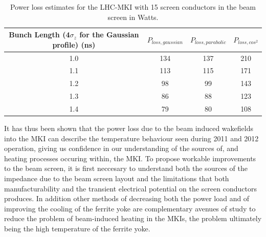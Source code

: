\begin{table}
\caption{Power loss estimates for the LHC-MKI with 15 screen conductors in the beam screen in Watts.}
\label{tab:mki-15-heating}
\begin{center}
\begin{tabular}{c | c | c | c}
Bunch Length (4$\sigma_{z}$ for the Gaussian profile) (ns) & $P_{loss, gaussian}$ & $P_{loss, parabolic}$ & $P_{loss, cos^{2}}$ \\ \hline
1.0 & 134 & 137 & 210 \\ \hline
1.1 & 113 & 115 & 171 \\ \hline
1.2 & 98 & 99 & 143 \\ \hline
1.3 & 86 & 88 & 123 \\ \hline
1.4 & 79 & 80 & 108 \\ \hline
\end{tabular}
\end{center}
\end{table}

It has thus been shown that the power loss due to the beam induced wakefields into the MKI can describe the temperature behaviour seen during 2011 and 2012 operation, giving us confidence in our understanding of the sources of, and heating processes occuring within, the MKI. To propose workable improvements to the beam screen, it is first neccesary to understand both the sources of the impedance due to the beam screen layout and the limitations that both manufacturability and the transient electrical potential on the screen conductors produces. In addition other methods of decreasing both the power load and of improving the cooling of the ferrite yoke are complementary avenues of study to reduce the problem of beam-induced heating in the MKIs, the problem ultimately being the high temperature of the ferrite yoke.

